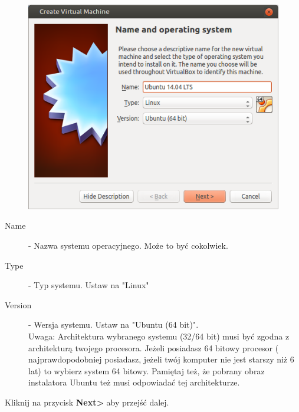 \begin{figure}
                \includegraphics[width=\linewidth]{images/virtualbox_wizard1.png}
\end{figure}
\begin{description}
\item[Name] - Nazwa systemu operacyjnego. Może to być cokolwiek.
\item[Type] - Typ systemu. Ustaw na "Linux"
\item[Version] - Wersja systemu. Ustaw na "Ubuntu (64 bit)".\\
Uwaga: Architektura wybranego systemu (32/64 bit) musi być zgodna z architekturą twojego procesora. Jeżeli posiadasz 64 bitowy procesor ( najprawdopodobniej posiadasz, jeżeli twój komputer nie jest starszy niż 6 lat) to wybierz system 64 bitowy. Pamiętaj też, że pobrany obraz instalatora Ubuntu też musi odpowiadać tej architekturze.
\end{description}
\begin{flushright}
Kliknij na przycisk \textbf{Next\textgreater} aby przejść dalej.
\end{flushright}
\onecolumn
\clearpage
